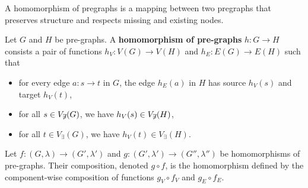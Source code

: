  A homomorphism of pregraphs is a mapping between two pregraphs that preserves structure and respects missing and existing nodes.
 \begin{definition}
    \label{def:pregraph:homomorphism}
    Let \( G \) and \( H \) be pre-graphs. A \textbf{homomorphism of pre-graphs} $h: G \to H$ consists a pair of functions $h_V: V(G) \to V(H) $ and $h_E: E(G) \to E(H)$ such that
    \begin{itemize}
        \item for every edge \( a \colon s \to t \) in \( G \), the edge \( h_E(a) \) in $H$ has source \( h_V(s) \) and target \( h_V(t) \),
        \item for all $s \in V_{\not \exists}(G)$, we have $h_V(s) \in V_{\not \exists}(H)$,
        \item for all $t \in V_\exists(G)$, we have $h_V(t) \in V_\exists(H)$.
    \end{itemize} 
\end{definition}

\begin{definition}[Composition]
    \label{def:pregraph:composition}
    Let $f: (G,\lambda) \to (G',\lambda')$ and $g: (G',\lambda') \to (G'',\lambda'')$ be homomorphisms of pre-graphs. Their composition, denoted $g \circ f$, is the homomorphism defined by the component-wise composition of functions $g_V \circ f_V$ and $g_E \circ f_E$.
\end{definition}

